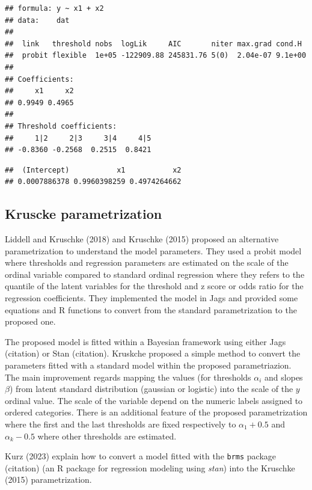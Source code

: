 \documentclass[
  man,floatsintext]{apa6}
\begin{document}
\begin{verbatim}
## formula: y ~ x1 + x2
## data:    dat
## 
##  link   threshold nobs  logLik     AIC       niter max.grad cond.H 
##  probit flexible  1e+05 -122909.88 245831.76 5(0)  2.04e-07 9.1e+00
## 
## Coefficients:
##     x1     x2 
## 0.9949 0.4965 
## 
## Threshold coefficients:
##     1|2     2|3     3|4     4|5 
## -0.8360 -0.2568  0.2515  0.8421
\end{verbatim}

\begin{verbatim}
##  (Intercept)           x1           x2 
## 0.0007886378 0.9960398259 0.4974264662
\end{verbatim}

\normalsize

\subsection{Kruscke parametrization}\label{kruscke-parametrization}

Liddell and Kruschke (2018) and Kruschke (2015) proposed an alternative parametrization to understand the model parameters. They used a probit model where thresholds and regression parameters are estimated on the scale of the ordinal variable compared to standard ordinal regression where they refers to the quantile of the latent variables for the threshold and z score or odds ratio for the regression coefficients. They implemented the model in Jags and provided some equations and R functions to convert from the standard parametrization to the proposed one.

The proposed model is fitted within a Bayesian framework using either Jags (citation) or Stan (citation). Kruskche proposed a simple method to convert the parameters fitted with a standard model within the proposed parametriazion. The main improvement regards mapping the values (for thresholds \(\alpha_i\) and slopes \(\beta\)) from latent standard distribution (gaussian or logistic) into the scale of the \(y\) ordinal value. The scale of the variable depend on the numeric labels assigned to ordered categories. There is an additional feature of the proposed parametrization where the first and the last thresholds are fixed respectively to \(\alpha_1 + 0.5\) and \(\alpha_k - 0.5\) where other thresholds are estimated.

Kurz (2023) explain how to convert a model fitted with the \texttt{brms} package (citation) (an R package for regression modeling using \emph{stan}) into the Kruschke (2015) parametrization.
\end{document}
